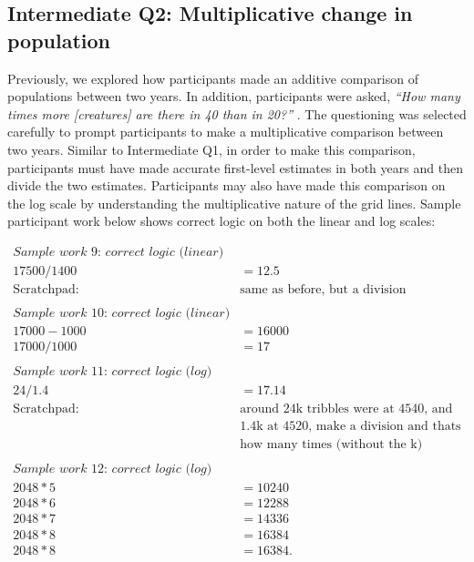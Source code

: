 \documentclass[print]{nuthesis}
\begin{document}
\hypertarget{intermediate-q2-multiplicative-change-in-population}{%
\subsection{Intermediate Q2: Multiplicative change in population}\label{intermediate-q2-multiplicative-change-in-population}}

Previously, we explored how participants made an additive comparison of populations between two years.
In addition, participants were asked, \emph{``How many times more {[}creatures{]} are there in 40 than in 20?''} .
The questioning was selected carefully to prompt participants to make a multiplicative comparison between two years.
Similar to Intermediate Q1, in order to make this comparison, participants must have made accurate first-level estimates in both years and then divide the two estimates.
Participants may also have made this comparison on the log scale by understanding the multiplicative nature of the grid lines. Sample participant work below shows correct logic on both the linear and log scales:

\begin{align}
\textit{Sample work 9: correct logic (linear)} \nonumber\\
17500/1400&=12.5 \nonumber\\    
\text{Scratchpad: } & \text{same as before, but a division} \nonumber\\
\nonumber\\
\textit{Sample work 10: correct logic (linear)} \nonumber\\
17000-1000&=16000 \nonumber\\
17000/1000&=17  \nonumber\\
\nonumber\\
\textit{Sample work 11: correct logic (log)} \nonumber\\
24/1.4&=17.14    \nonumber\\ 
\text{Scratchpad: } & \text{around 24k tribbles were at 4540, and} \nonumber\\
                   & \text{1.4k at 4520, make a division and thats}\nonumber\\
                   & \text{how many times (without the k)}\nonumber\\
\nonumber \\
\textit{Sample work 12: correct logic (log)} \nonumber\\                   
2048*5&=10240 \nonumber\\   
2048*6&=12288 \nonumber\\   
2048*7&=14336 \nonumber\\   
2048*8&=16384  \nonumber\\   
2048*8&=16384. \nonumber
\end{align}
\end{document}
